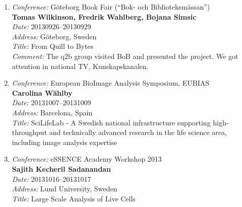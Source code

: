 \begin{enumerate}









\item 
{\em Conference:} Göteborg Book Fair (``Bok- och Biblioteksm\"{a}ssan'')~\\
{\bf Tomas Wilkinson, Fredrik Wahlberg, Bojana Simsic}~\\
{\em Date:} 20130926--20130929~\\
{\em Address:} G\"{o}teborg, Sweden~\\
{\em Title:} From Quill to Bytes~\\
{\em Comment:} The q2b group visited BoB and presented the project. We got attention in national TV, Kunskapskanalen.

\item 
{\em Conference:} European BioImage Analysis Symposium, EUBIAS~\\
{\bf Carolina W\"{a}hlby}~\\
{\em Date:} 20131007--20131009~\\
{\em Address:} Barcelona, Spain~\\
{\em Title:} SciLifeLab - A Swedish national infrastructure supporting high-throughput and technically advanced research in the life science area, including image analysis expertise

\item 
{\em Conference:} eSSENCE Academy Workshop 2013~\\
{\bf Sajith Kecheril Sadanandan}~\\
{\em Date:} 20131016--20131017~\\
{\em Address:} Lund University, Sweden~\\
{\em Title:} Large Scale Analysis of Live Cells

\end{enumerate}

